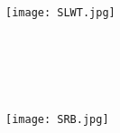 \documentclass[13pt, letter,final]{article}
\begin{document}
\texttt{[image: SLWT.jpg]}\\
\\
\\
\\
\\
\\
\texttt{[image: SRB.jpg]}


\newpage

\newpage

\newpage

\newpage

\end{document}
